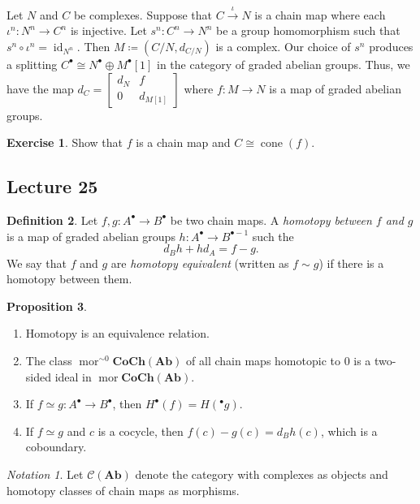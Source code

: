 \documentclass[10pt,letterpaper,cm]{nupset}
\theoremstyle{definition}
\newtheorem{definition}{Definition}[subsection]
\theoremstyle{theorem}
\newtheorem{prop}[definition]{Proposition}
\newtheorem{exercise}[definition]{Exercise}
\theoremstyle{remark}
\newtheorem*{notation}{Notation}
\newcommand{\1}{\mathbf{1}}
\newcommand{\0}{\vec 0}
\DeclareMathOperator{\id}{id}
\DeclareMathOperator{\mor}{mor}
\DeclareMathOperator{\cone}{cone}
\begin{document}
\smallskip

 Let $N$ and $C$ be complexes. Suppose that $C \overset{\iota}{\longrightarrow} N$ is a chain map where each $\iota^n :N^n \to C^n$ is injective. Let $s^n : C^n \to N^n$ be a group homomorphism such that $s^n \circ \iota^n = \id_{N^n}$. Then $M\coloneqq  \left(C/N, d_{C/N}\right)$ is a complex. Our choice of $s^n$ produces a splitting $C^{\bullet} \cong N^{\bullet} \oplus M^{\bullet}[1]$ in the category of  graded abelian groups. Thus, we have the map $d_C = \begin{bmatrix} d_N & f \\ 0 & d_{M[1]} \end{bmatrix}$ where $f: M \to N$ is a map of graded abelian groups.

\begin{exercise} 
 Show that $f$ is a chain map and $C \cong \cone(f)$.
\end{exercise}

\subsection{Lecture 25}

\begin{definition}
Let $f, g : A^{\bullet} \to B^{\bullet}$ be two chain maps. A \textit{homotopy between $f$ and $g$} is a map of graded abelian groups $h: A^{\bullet} \to B^{\bullet -1}$ such the $$d_Bh + hd_A = f-g. $$ We say that $f$ and $g$ are \textit{homotopy equivalent} (written as $f \sim g$) if there is a homotopy between them.
\end{definition}

\begin{prop} $ $
\begin{enumerate}
\item Homotopy is an equivalence relation. 
\item The class $\mor^{\sim{0}}{\mathbf{CoCh(Ab)}}$ of all chain maps homotopic to $0$ is a two-sided ideal in  $\mor{\mathbf{CoCh(Ab)}}$. 
\item If $ f \simeq g: A^{\bullet} \to B^{\bullet}$, then $H^{\bullet}(f) = H(^{\bullet}g)$.
\item If $f\simeq g$ and $c$ is a cocycle, then $f(c) - g(c) = d_Bh(c)$, which is a coboundary.
\end{enumerate}
\end{prop}

\begin{notation}
Let $\mathcal{C}(\mathbf{Ab})$ denote the category with complexes as objects and homotopy classes of chain maps as morphisms.  
\end{notation}
\end{document}
